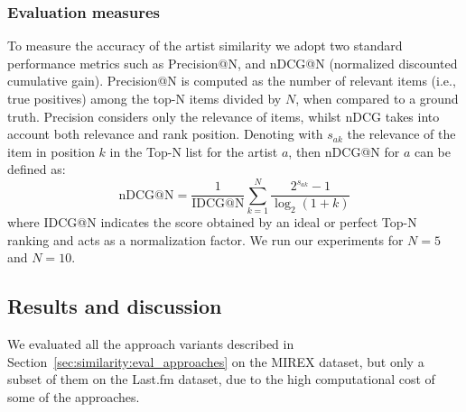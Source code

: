 \subsubsection{Evaluation measures}

To measure the accuracy of the artist similarity we adopt two standard performance metrics such as Precision@N, and nDCG@N (normalized discounted cumulative gain).
Precision@N is computed as the number of relevant items (i.e., true positives) among the top-N items divided by $N$, when compared to a ground truth.
Precision considers only the relevance of items, whilst nDCG takes into account both relevance and rank position. Denoting with  $s_{ak}$ the relevance of the item in position $k$ in the Top-N list for the artist $a$, then nDCG@N for $a$ can be defined as:
\begin{equation}\label{eq:recall}
\text{nDCG@N} = \frac{1 }{\text{IDCG@N}} \sum^N_{k=1} \frac{ 2^{ s_{ak}} -1 }{\log_2 (1+k)}
\end{equation}
where IDCG@N indicates the score obtained by an ideal or perfect Top-N ranking and acts as a normalization factor. We run our experiments for $N=5$ and $N=10$.

\subsection{Results and discussion}
\label{sec:similarity:results}

We evaluated all the approach variants described in Section~\ref{sec:similarity:eval_approaches} on the MIREX dataset, but only a subset of them on the Last.fm dataset, due to the high computational cost of some of the approaches.

